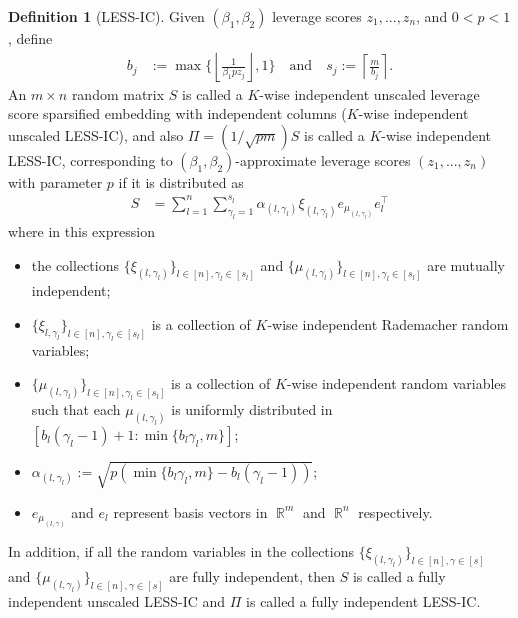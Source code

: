 \documentclass[11pt]{amsart}
\numberwithin{equation}{section}
\numberwithin{equation}{section}
\DeclareMathOperator{\R}{\mathbb{R}}
\theoremstyle{remark}
\theoremstyle{definition}
\newtheorem{definition}[theorem]{Definition}
\begin{document}
\begin{definition}[LESS-IC]\label{def:lessindcol}
    Given $(\beta_1,\beta_2)$ leverage scores $z_1,...,z_n$, and $0 < p < 1 $, define
    \begin{align*}
        b_j &:= 
        \max \Big\{ \left\lfloor \frac{1}{\beta_1pz_j} \right\rfloor, 1 \Big\}\quad\text{and}\quad
        s_j := \left\lceil \frac{m}{b_j} \right\rceil.
    \end{align*} 
    An $m \times n$ random matrix $S$ is called a $K$-wise independent unscaled leverage score sparsified embedding with independent columns ($K$-wise independent unscaled LESS-IC), and also $\Pi = (1/\sqrt{pm})S$ is called a $K$-wise independent LESS-IC, corresponding to  $(\beta_1, \beta_2)$-approximate leverage scores  $(z_1,...,z_n)$ with parameter $p$ if it is distributed as
    \begin{align*}
    S &= \sum_{l=1}^n \sum_{\gamma_l=1}^{s_l} \alpha_{(l, \gamma_l)} \xi_{(l,\gamma_l)} e_{\mu_{(l, \gamma_l)}} e_l ^\top 
\end{align*}
where in this expression
\begin{itemize}
    \item the collections $\{ \xi_{(l,\gamma_l)} \}_{l \in [n], \gamma_l \in [s_l]}$ and $\{ \mu_{(l,\gamma_l)} \}_{l \in [n], \gamma_l \in [s_l]}$ are mutually independent;
    \item $\{ \xi_{l,\gamma_l} \}_{l \in [n], \gamma_l \in [s_l]}$ is a collection of $K$-wise independent Rademacher random variables;
    \item $\{ \mu_{(l,\gamma_l)} \}_{l \in [n], \gamma_l \in [s_l]}$ is a collection of $K$-wise independent random variables such that each $\mu_{(l,\gamma_l)}$ is uniformly distributed in $[b_l(\gamma_l-1)+1:\min \{ b_l\gamma_l, m \}]$;
    \item $\alpha_{(l, \gamma_l)} := \sqrt{p(\min \{ b_l\gamma_l, m \} - b_l(\gamma_l-1))}$;
    \item $e_{\mu_{(l, \gamma)}}$ and $e_l$ represent basis vectors in $\R^m$ and $\R^n$ respectively.
\end{itemize}
In addition, if all the random variables in the collections $\{ \xi_{(l,\gamma_{l})} \}_{l \in [n], \gamma \in [s]}$ and $\{ \mu_{(l,\gamma_l)} \}_{l \in [n], \gamma \in [s]}$ are fully independent, then $S$ is called a fully independent unscaled LESS-IC and $\Pi$ is called a fully independent LESS-IC.
\end{definition}


\lessicmainthm*
\end{document}
